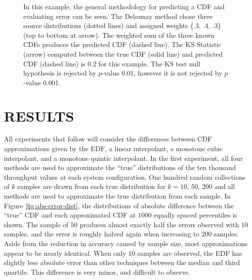 \documentclass[letterpaper, 10 pt, conference]{ieeeconf}  %
\begin{document}
\begin{figure}
  \vspace{-0.3cm}
  \caption{In this example, the general methodology for predicting a CDF and evaluating error can be seen. The Delaunay method chose three source distributions (dotted lines) and assigned weights \{.3, .4, .3\} (top to bottom at arrow). The weighted sum of the three known CDFs produces the predicted CDF (dashed line). The KS Statistic (arrow) computed between the true CDF (solid line) and predicted CDF (dashed line) is 0.2 for this example. The KS test null hypothesis is rejected by $p$-value 0.01, however it is not rejected by $p$-value 0.001.
  \vspace{-.1cm}}
  \label{fig:prediction-example}
\end{figure}


\section{RESULTS}
\label{sec:results}

All experiments that follow will consider the differences between CDF approximations given by the EDF, a linear interpolant, a monotone cubic interpolant, and a monotone quintic interpolant. In the first experiment, all four methods are used to approximate the ``true'' distributions of the ten thousand throughput values at each system configuration. One hundred random collections of $k$ samples are drawn from each true distribution for $k = 10$, $50$, $200$ and all methods are used to approximate the true distribution from each sample. In Figure \ref{fig:abs-error-dist}, the distributions of absolute difference between the ``true'' CDF and each approximated CDF at $1000$ equally spaced percentiles is shown. The sample of $50$ produces almost exactly half the errors observed with $10$ samples, and the error is roughly halved again when increasing to $200$ samples. Aside from the reduction in accuracy caused by sample size, most approximations appear to be nearly identical. When only $10$ samples are observed, the EDF has slightly less absolute error than other techniques between the median and third quartile. This difference is very minor, and difficult to observe.
\end{document}
